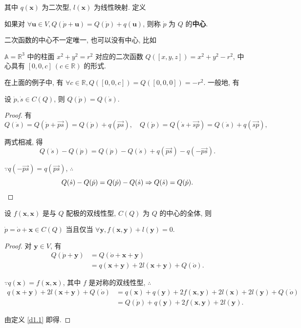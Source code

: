 \documentclass[color=black,device=normal,lang=cn,mode=geye]{elegantnote}
\begin{document}
其中 $q(\boldsymbol{x})$ 为二次型, $l(\boldsymbol{x})$ 为线性映射. 定义
\begin{definition}\label{d1.1}
    如果对 $\forall\boldsymbol{u}\in V,Q(\dot{p}+\boldsymbol{u})=Q(\dot{p})+q(\boldsymbol{u})$, 则称 $\dot{p}$ 为 $Q$ 的\textbf{中心}.
\end{definition}
二次函数的中心不一定唯一, 也可以没有中心, 比如
\begin{example}
    $\mathbb{A}=\mathbb{R}^3$ 中的柱面 $x^2+y^2=r^2$ 对应的二次函数 $Q([x,y,z])=x^2+y^2-r^2$, 中心具有 $[0,0,c]\ (c\in\mathbb{R})$ 的形式.
\end{example}
在上面的例子中, 有 $\forall c\in\mathbb{R},Q([0,0,c])=Q([0,0,0])=-r^2$. 一般地, 有
\begin{theorem}\label{t1.1}
    设 $\dot{p},\dot{s}\in C(Q)$, 则 $Q(\dot{p})=Q(\dot{s})$.
\end{theorem}
\begin{proof}
    有
    \[Q(\dot{s})=Q(\dot{p}+\overrightarrow{ps})=Q(\dot{p})+q(\overrightarrow{ps}),\quad Q(\dot{p})=Q(\dot{s}+\overrightarrow{sp})=Q(\dot{s})+q(\overrightarrow{sp}),\]

    两式相减, 得
    \[Q(\dot{s})-Q(\dot{p})=Q(\dot{p})-Q(\dot{s})+q(\overrightarrow{ps})-q(-\overrightarrow{ps}).\]

    $\because q(-\overrightarrow{ps})=q(\overrightarrow{ps})$, $\therefore$
    \[Q(\dot{s})-Q(\dot{p})=Q(\dot{p})-Q(\dot{s})\Rightarrow Q(\dot{s})=Q(\dot{p}).\qedhere\]
\end{proof}
设 $f(\boldsymbol{x},\boldsymbol{x})$ 是与 $Q$ 配极的双线性型, $C(Q)$ 为 $Q$ 的中心的全体, 则
\begin{theorem}\label{t1.2}
    $\dot{p}=\dot{o}+\boldsymbol{x}\in C(Q)$ 当且仅当 $\forall\boldsymbol{y},f(\boldsymbol{x},\boldsymbol{y})+l(\boldsymbol{y})=0$.
\end{theorem}
\begin{proof}
    对 $\boldsymbol{y}\in V$, 有
    \begin{align*}
        Q(\dot{p}+\boldsymbol{y}) & =Q(\dot{o}+\boldsymbol{x}+\boldsymbol{y}) \\
        & =q(\boldsymbol{x}+\boldsymbol{y})+2l(\boldsymbol{x}+\boldsymbol{y})+Q(\dot{o}).
    \end{align*}

    $\because q(\boldsymbol{x})=f(\boldsymbol{x},\boldsymbol{x})$, 其中 $f$ 是对称的双线性型, $\therefore$
    \begin{align*}
        q(\boldsymbol{x}+\boldsymbol{y})+2l(\boldsymbol{x}+\boldsymbol{y})+Q(\dot{o}) & =q(\boldsymbol{x})+q(\boldsymbol{y})+2f(\boldsymbol{x},\boldsymbol{y})+2l(\boldsymbol{x})+2l(\boldsymbol{y})+Q(\dot{o}) \\
        & =Q(\dot{p})+q(\boldsymbol{y})+2f(\boldsymbol{x},\boldsymbol{y})+2l(\boldsymbol{y}).
    \end{align*}

    由定义 \ref{d1.1} 即得.
\end{proof}
\end{document}
